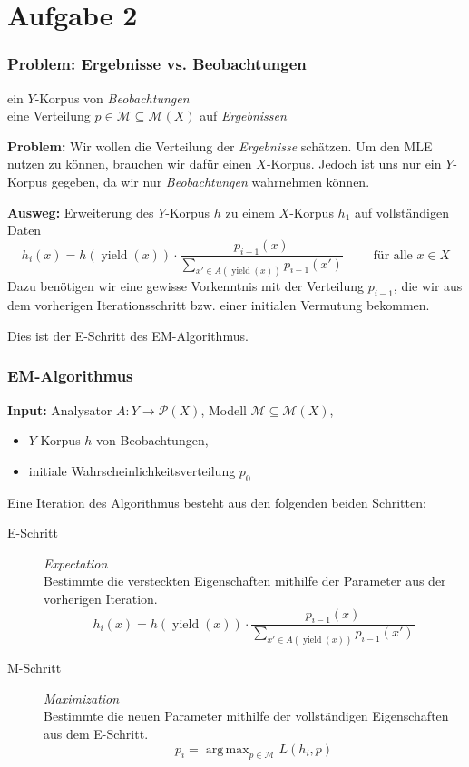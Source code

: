 \documentclass{beamer}
\DeclareMathOperator*{\argmax}{arg\,max}
\begin{document}
\section{Aufgabe 2}

\begin{frame} \frametitle{Problem: Ergebnisse vs. Beobachtungen}
	\justifying \footnotesize 
	 ein $Y$-Korpus von \textit{Beobachtungen} \\	
	 eine Verteilung $p \in \mathcal{M} \subseteq \mathcal{M}(X)$ auf \textit{Ergebnissen}
	
	\bigskip \pause
	
	\textbf{Problem:} Wir wollen die Verteilung der \textit{Ergebnisse} schätzen. Um den MLE nutzen zu können, brauchen wir dafür einen $X$-Korpus. Jedoch ist uns nur ein $Y$-Korpus gegeben, da wir nur \textit{Beobachtungen} wahrnehmen können. 
	\pause
	
	\textbf{Ausweg:} Erweiterung des $Y$-Korpus $h$ zu einem $X$-Korpus $h_1$ auf vollständigen Daten
	\begin{equation*}
		h_i(x) = h(\operatorname{yield}(x)) \cdot \frac{p_{i-1}(x)}{\sum_{x' \in A(\operatorname{yield}(x))} p_{i-1}(x')} \qquad \text{ für alle } x \in X
	\end{equation*}
	Dazu benötigen wir eine gewisse Vorkenntnis mit der Verteilung $p_{i-1}$, die wir aus dem vorherigen Iterationsschritt bzw. einer initialen Vermutung bekommen.
	
	Dies ist der E-Schritt des EM-Algorithmus.
\end{frame}

\begin{frame} \frametitle{EM-Algorithmus}
	\footnotesize
	\textbf{Input:} Analysator $A : Y \to \mathcal{P}(X)$, Modell $\mathcal{M} \subseteq \mathcal{M}(X)$, \\
	\begin{itemize}
		\item $Y$-Korpus $h$ von Beobachtungen,
		\item initiale Wahrscheinlichkeitsverteilung $p_0$ 
	\end{itemize}
	
	Eine Iteration des Algorithmus besteht aus den folgenden beiden Schritten:
	\begin{description}
		\item[E-Schritt] \textit{Expectation} \\
		Bestimmte die versteckten Eigenschaften mithilfe der Parameter aus der vorherigen Iteration.
		\begin{equation*}
		h_i(x) = h(\operatorname{yield}(x)) \cdot \frac{p_{i-1}(x)}{\sum_{x' \in A(\operatorname{yield}(x))} p_{i-1}(x')}
		\end{equation*}
		\item[M-Schritt] \textit{Maximization} \\
		Bestimmte die neuen Parameter mithilfe der vollständigen Eigenschaften aus dem E-Schritt.
		\begin{equation*}
		p_i = \argmax_{p \in \mathcal{M}} L(h_i, p)
		\end{equation*}
	\end{description}
\end{frame}
\end{document}
